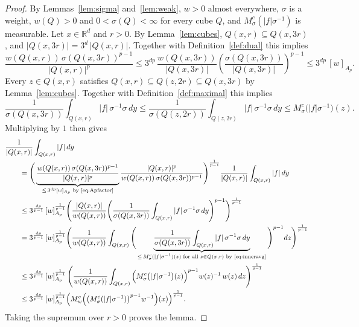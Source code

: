 \documentclass[12pt]{article}
\begin{document}
\begin{proof}
By Lemmas~\ref{lem:sigma} and~\ref{lem:weak}, $w > 0$ almost everywhere, $\sigma$ is a weight, $w(Q) > 0$ and $0 < \sigma(Q) < \infty$ for every cube $Q$, and $M^c_\sigma(|f|\sigma^{-1})$ is measurable. Let $x \in \mathbb{R}^d$ and $r > 0$. By Lemma~\ref{lem:cubes}, $Q(x,r) \subseteq Q(x,3r)$, and $|Q(x,3r)| = 3^d\,|Q(x,r)|$. Together with Definition~\ref{def:dual} this implies
\begin{equation}\label{eq:Apfactor}
  \frac{w(Q(x,r))\,\sigma(Q(x,3r))^{p-1}}{|Q(x,r)|^{p}} \le 3^{dp}\, \frac{w(Q(x,3r))}{|Q(x,3r)|} \left( \frac{\sigma(Q(x,3r))}{|Q(x,3r)|} \right)^{p-1} \le 3^{dp}\, [w]_{A_p}.
\end{equation}
Every $z \in Q(x,r)$ satisfies $Q(x,r) \subseteq Q(z,2r) \subseteq Q(x,3r)$ by Lemma~\ref{lem:cubes}. Together with Definition~\ref{def:maximal} this implies
\begin{equation}\label{eq:inneravg}
  \frac{1}{\sigma(Q(x,3r))} \int_{Q(x,r)} |f|\,\sigma^{-1}\sigma\,dy \le \frac{1}{\sigma(Q(z,2r))} \int_{Q(z,2r)} |f|\,\sigma^{-1}\sigma\,dy \le M^c_\sigma\big(|f|\sigma^{-1}\big)(z).
\end{equation}
Multiplying by $1$ then gives
\begin{align*}
  \MoveEqLeft \frac{1}{|Q(x,r)|} \int_{Q(x,r)} |f|\,dy \\
  &= \Bigg( \underbrace{\frac{w(Q(x,r))\,\sigma(Q(x,3r))^{p-1}}{|Q(x,r)|^{p}}}_{\le\, 3^{dp} [w]_{A_p} \text{ by \eqref{eq:Apfactor}}} \frac{|Q(x,r)|^{p}}{w(Q(x,r))\,\sigma(Q(x,3r))^{p-1}} \Bigg)^{\frac{1}{p-1}} \frac{1}{|Q(x,r)|} \int_{Q(x,r)} |f|\,dy \\
  &\le 3^{\frac{dp}{p-1}}\, [w]_{A_p}^{\frac{1}{p-1}} \Bigg( \frac{|Q(x,r)|}{w(Q(x,r))} \Bigg( \frac{1}{\sigma(Q(x,3r))} \int_{Q(x,r)} |f|\,\sigma^{-1}\sigma\,dy \Bigg)^{p-1} \Bigg)^{\frac{1}{p-1}} \\
  &= 3^{\frac{dp}{p-1}}\, [w]_{A_p}^{\frac{1}{p-1}} \Bigg( \frac{1}{w(Q(x,r))} \int_{Q(x,r)} \Bigg( \underbrace{\frac{1}{\sigma(Q(x,3r))} \int_{Q(x,r)} |f|\,\sigma^{-1}\sigma\,dy}_{\substack{\le\, M^c_\sigma(|f|\sigma^{-1})(z) \text{ for all } z \in Q(x,r) \text{ by \eqref{eq:inneravg}}}} \Bigg)^{p-1} dz \Bigg)^{\frac{1}{p-1}} \\
  &\le 3^{\frac{dp}{p-1}}\, [w]_{A_p}^{\frac{1}{p-1}} \left( \frac{1}{w(Q(x,r))} \int_{Q(x,r)} \Big( M^c_\sigma\big(|f|\sigma^{-1}\big)(z) \Big)^{p-1} w(z)^{-1}\, w(z)\,dz \right)^{\frac{1}{p-1}} \\
  &\le 3^{\frac{dp}{p-1}}\, [w]_{A_p}^{\frac{1}{p-1}} \Big( M^c_w\Big( \big(M^c_\sigma(|f|\sigma^{-1})\big)^{p-1} w^{-1} \Big)(x) \Big)^{\frac{1}{p-1}}.
\end{align*}
Taking the supremum over $r > 0$ proves the lemma.
\end{proof}
\end{document}
